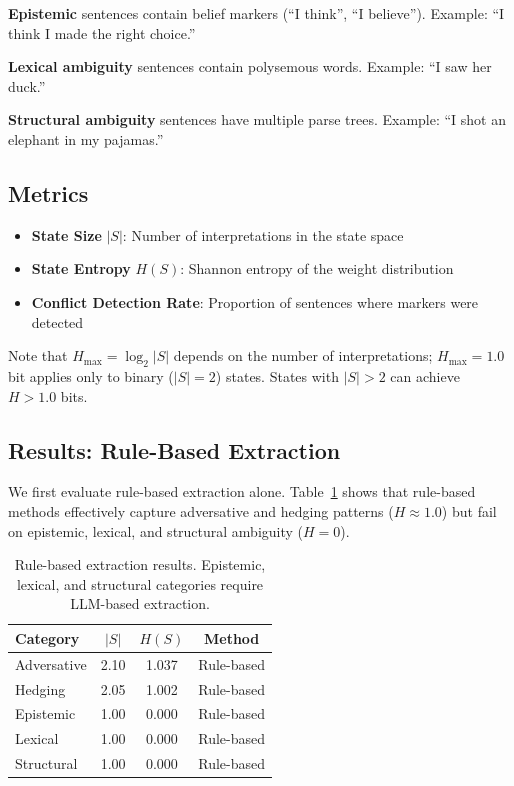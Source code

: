 \documentclass[11pt,a4paper]{article}
\begin{document}
\textbf{Epistemic} sentences contain belief markers (``I think'', ``I believe''). 
Example: ``I think I made the right choice.''

\textbf{Lexical ambiguity} sentences contain polysemous words. 
Example: ``I saw her duck.''

\textbf{Structural ambiguity} sentences have multiple parse trees. 
Example: ``I shot an elephant in my pajamas.''

\subsection{Metrics}

\begin{itemize}
    \item \textbf{State Size} $|S|$: Number of interpretations in the state space
    \item \textbf{State Entropy} $H(S)$: Shannon entropy of the weight distribution
    \item \textbf{Conflict Detection Rate}: Proportion of sentences where markers were detected
\end{itemize}

\noindent Note that $H_{\max} = \log_2 |S|$ depends on the number of interpretations; $H_{\max} = 1.0$ bit applies only to binary ($|S|=2$) states. States with $|S| > 2$ can achieve $H > 1.0$ bits.

\subsection{Results: Rule-Based Extraction}

We first evaluate rule-based extraction alone. Table~\ref{tab:results-rule} shows 
that rule-based methods effectively capture adversative and hedging patterns 
($H \approx 1.0$) but fail on epistemic, lexical, and structural ambiguity ($H = 0$).

\begin{table}[h]
\centering
\begin{tabular}{lccc}
\toprule
\textbf{Category} & \textbf{$|S|$} & \textbf{$H(S)$} & \textbf{Method} \\
\midrule
Adversative & 2.10 & 1.037 & Rule-based \\
Hedging & 2.05 & 1.002 & Rule-based \\
Epistemic & 1.00 & 0.000 & Rule-based \\
Lexical & 1.00 & 0.000 & Rule-based \\
Structural & 1.00 & 0.000 & Rule-based \\
\bottomrule
\end{tabular}
\caption{Rule-based extraction results. Epistemic, lexical, and structural 
categories require LLM-based extraction.}
\label{tab:results-rule}
\end{table}
\end{document}
